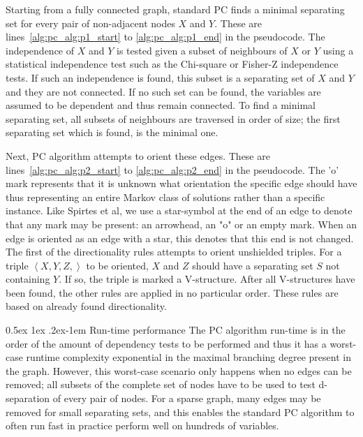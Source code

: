 \documentclass[a4paper, 10pt, english, onecolumn]{article}
\makeatletter
\renewcommand{\paragraph}{%
  \@startsection{paragraph}{4}%
  {\z@}{0.5ex \@plus 1ex \@minus .2ex}{-1em}%
  {\normalfont\normalsize\bfseries}%
}
\makeatother
\begin{document}
Starting from a fully connected graph, standard PC finds a minimal separating set for every pair of non-adjacent nodes $X$ and $Y$.
These are lines~\ref{alg:pc_alg:p1_start} to \ref{alg:pc_alg:p1_end} in the pseudocode.
The independence of $X$ and $Y$ is tested given a subset of neighbours of $X$ or $Y$ using a statistical independence test such as the Chi-square or Fisher-Z independence tests. %
If such an independence is found, this subset is a separating set of $X$ and $Y$ and they are not connected.
If no such set can be found, the variables are assumed to be dependent and thus remain connected.
To find a minimal separating set, all subsets of neighbours are traversed in order of size; the first separating set which is found, is the minimal one.

Next, PC algorithm attempts to orient these edges.
These are lines~\ref{alg:pc_alg:p2_start} to \ref{alg:pc_alg:p2_end} in the pseudocode.
The 'o' mark represents that it is unknown what orientation the specific edge should have thus representing an entire Markov class of solutions rather than a specific instance.
Like Spirtes et al, we use a star-symbol at the end of an edge to denote that any mark may be present: an arrowhead, an "o" or an empty mark.
When an edge is oriented as an edge with a star, this denotes that this end is not changed.
The first of the directionality rules attempts to orient unshielded triples.
For a triple $\left < X,Y,Z, \right>$ to be oriented, $X$ and $Z$ should have a separating set $S$ not containing $Y$.
If so, the triple is marked a V-structure.
After all V-structures have been found, the other rules are applied in no particular order.
These rules are based on already found directionality.

\paragraph{Run-time performance}
The PC algorithm run-time is in the order of the amount of dependency tests to be performed and thus it has a worst-case runtime complexity exponential in the maximal branching degree present in the graph.
However, this worst-case scenario only happens when no edges can be removed; all subsets of the complete set of nodes have to be used to test d-separation of every pair of nodes.
For a sparse graph, many edges may be removed for small separating sets, and this enables the standard PC algorithm to often run fast in practice perform well on hundreds of variables. %
\end{document}
